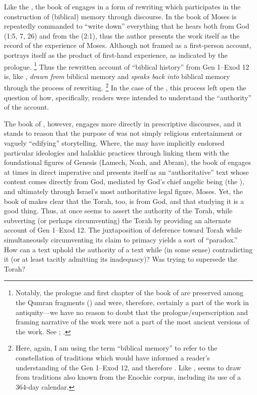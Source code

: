 
Like the \ga, the book of \jub engages in a form of rewriting which participates in the construction of (biblical) memory through \psgraphical discourse. In the book of \jub Moses is repeatedly commanded to ``write down'' everything that he hears both from God (1:5, 7, 26) and from the \ap (2:1), thus the author presents the work itself as the record of the experience of Moses. Although not framed as a first-person account, \jub portrays itself as the product of first-hand experience, as indicated by the prologue.%
    \footnote{Notably, the prologue and first chapter of the book of \jub are preserved among the Qumran fragments () and were, therefore, certainly a part of the work in antiquity---we have no reason to doubt that the prologue/superscription and framing narrative of the work were not a part of the most ancient versions of the work. See \cite[1:125]{vanderkam2018}; \cite[25]{vanderkam_metso-etal2010}.}
 Thus the rewritten account of ``biblical history'' from Gen 1--Exod 12 is, like \ga, \emph{drawn from} biblical memory and \emph{speaks back into} biblical memory through the process of rewriting.%
    \footnote{Here, again, I am using the term ``biblical memory'' to refer to the constellation of traditions which would have informed a reader's understanding of the Gen 1--Exod 12, and therefore \jub. Like \ga, \jub seems to draw from traditions also known from the Enochic corpus, including its use of a 364-day calendar.}
In the case of the \ga, this process left open the question of how, specifically, readers were intended to understand the ``authority'' of the account.

The book of \jub, however, engages more directly in prescriptive discourses, and it stands to reason that the purpose of \jub was not simply religious entertainment or vaguely ``edifying'' storytelling. Where, the \ga may have implicitly endorsed particular ideologies and halakhic practices through linking them with the foundational figures of Genesis (Lamech, Noah, and Abram), the book of \jub engages at times in direct imperative and presents itself as an ``authoritative'' text whose content comes directly from God, mediated by God's chief angelic being (the \ap), and ultimately through Israel's most authoritative legal figure, Moses. Yet, the book of \jub makes clear that the Torah, too, is from God, and that studying it is a good thing. Thus, \jub at once seems to assert the authority of the Torah, while subverting (or perhaps circumventing) the Torah by providing an alternate account of Gen 1--Exod 12. The juxtaposition of deference toward Torah while simultaneously circumventing its claim to primacy yields a sort of ``\psgraphical paradox.'' How can a text uphold the authority of a text while (in some sense) contradicting it (or at least tacitly admitting its inadequacy)? Was \jub trying to supersede the Torah?

